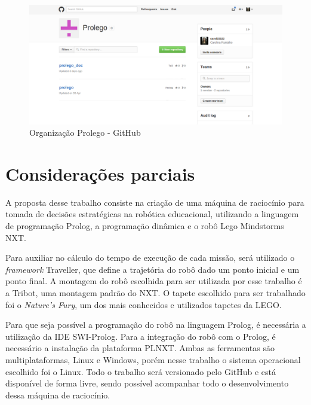 \vspace*{1in}

\FloatBarrier
\begin{figure}[!h]
\centering
\includegraphics[keepaspectratio=true,scale=0.4]{figuras/gitHub.png}
\caption{Organização Prolego - GitHub}
\label{gitHub}
\end{figure}
\clearpage

\section{Considerações parciais}
A proposta desse trabalho consiste na criação de uma máquina de raciocínio para tomada de decisões estratégicas na robótica educacional, utilizando a linguagem de programação Prolog, a programação dinâmica e o robô Lego Mindstorms NXT. 

Para auxiliar no cálculo do tempo de execução de cada missão, será utilizado o \textit{framework} Traveller, que define a trajetória do robô dado um ponto inicial e um ponto final. A montagem do robô escolhida para ser utilizada por esse trabalho é a Tribot, uma montagem padrão do NXT. O tapete escolhido para ser trabalhado foi o \textit{Nature's Fury}, um dos mais conhecidos e utilizados tapetes da LEGO. 

Para que seja possível a programação do robô na linguagem Prolog, é necessária a utilização da IDE SWI-Prolog. Para a integração do robô com o Prolog, é necessário a instalação da plataforma PLNXT. Ambas as ferramentas são multiplataformas, Linux e Windows, porém nesse trabalho o sistema operacional escolhido foi o Linux.
Todo o trabalho será versionado pelo GitHub e está disponível de forma livre, sendo possível acompanhar todo o desenvolvimento dessa máquina de raciocínio.